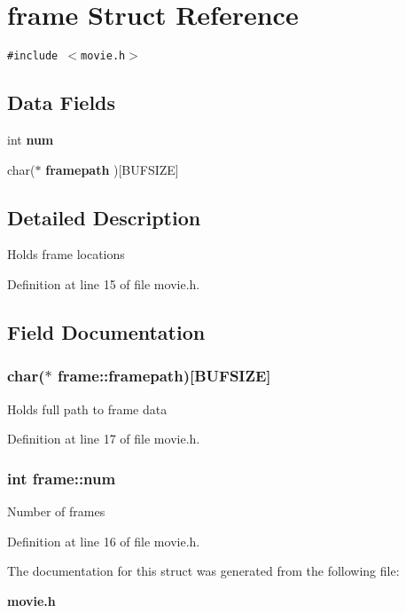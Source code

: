 \section{frame Struct Reference}
\label{structframe}
{\tt \#include $<$movie.h$>$}

\subsection*{Data Fields}
\begin{CompactItemize}
\item 
int {\bf num}
\item 
char($\ast$ {\bf framepath} )[BUFSIZE]
\end{CompactItemize}


\subsection{Detailed Description}
Holds frame locations 



Definition at line 15 of file movie.h.

\subsection{Field Documentation}
\subsubsection{\setlength{\rightskip}{0pt plus 5cm}char($\ast$ {\bf frame::framepath})[BUFSIZE]}\label{structframe_o1}


Holds full path to frame data 

Definition at line 17 of file movie.h.
\subsubsection{\setlength{\rightskip}{0pt plus 5cm}int {\bf frame::num}}\label{structframe_o0}


Number of frames 

Definition at line 16 of file movie.h.

The documentation for this struct was generated from the following file:\begin{CompactItemize}
\item 
{\bf movie.h}\end{CompactItemize}
